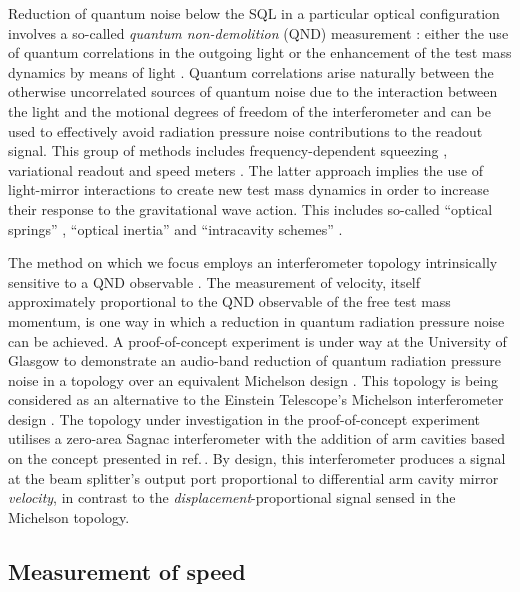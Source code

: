 Reduction of quantum noise below the SQL in a particular optical configuration involves a so-called \emph{quantum non-demolition} (\gls{QND}) measurement \cite{Braginsky1995}: either the use of quantum correlations in the outgoing light or the enhancement of the test mass dynamics by means of light \cite{Chen2011}. Quantum correlations arise naturally between the otherwise uncorrelated sources of quantum noise due to the interaction between the light and the motional degrees of freedom of the interferometer and can be used to effectively avoid radiation pressure noise contributions to the readout signal. This group of methods includes frequency-dependent squeezing \cite{Kimble2001}, variational readout \cite{Kimble2001, Vyatchanin1995, Vyatchanin1996} and speed meters \cite{Braginsky1990, Braginsky2000, Chen2003, Danilishin2004}. The latter approach implies the use of light-mirror interactions to create new test mass dynamics in order to increase their response to the gravitational wave action. This includes so-called ``optical springs'' \cite{Braginsky1999, Buonanno2002, Corbitt2007, Rehbein2008, Gordon2015}, ``optical inertia'' \cite{Khalili2011, Voronchev2012} and ``intracavity schemes'' \cite{Braginsky1997, Khalili2002, Danilishin2006}.
   
The method on which we focus employs an interferometer topology intrinsically sensitive to a QND observable \cite{Danilishin2012}. The measurement of velocity, itself approximately proportional to the QND observable of the free test mass momentum, is one way in which a reduction in quantum radiation pressure noise can be achieved. A proof-of-concept experiment is under way at the University of Glasgow to demonstrate an audio-band reduction of quantum radiation pressure noise in a \SSM{} topology over an equivalent Michelson design \cite{Graef2014}. This topology is being considered as an alternative to the Einstein Telescope's Michelson interferometer design \cite{MuellerEbhardt2009a, Voronchev2015}. The topology under investigation in the proof-of-concept experiment utilises a zero-area Sagnac interferometer with the addition of arm cavities based on the concept presented in ref.\,\cite{Chen2003}. By design, this interferometer produces a signal at the beam splitter's output port proportional to differential arm cavity mirror \emph{velocity}, in contrast to the \emph{displacement}-proportional signal sensed in the Michelson topology.

\subsection{Measurement of speed}

